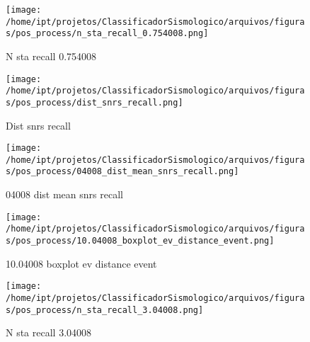                     \begin{figure}[H]
                        \centering
                        \texttt{[image: /home/ipt/projetos/ClassificadorSismologico/arquivos/figuras/pos\_process/n\_sta\_recall\_0.754008.png]}
                        \caption{N sta recall 0.754008}
                        \label{fig:n_sta_recall_0.754008}
                    \end{figure}
                

                    \begin{figure}[H]
                        \centering
                        \texttt{[image: /home/ipt/projetos/ClassificadorSismologico/arquivos/figuras/pos\_process/dist\_snrs\_recall.png]}
                        \caption{Dist snrs recall}
                        \label{fig:dist_snrs_recall}
                    \end{figure}
                

                    \begin{figure}[H]
                        \centering
                        \texttt{[image: /home/ipt/projetos/ClassificadorSismologico/arquivos/figuras/pos\_process/04008\_dist\_mean\_snrs\_recall.png]}
                        \caption{04008 dist mean snrs recall}
                        \label{fig:04008_dist_mean_snrs_recall}
                    \end{figure}
                

                    \begin{figure}[H]
                        \centering
                        \texttt{[image: /home/ipt/projetos/ClassificadorSismologico/arquivos/figuras/pos\_process/10.04008\_boxplot\_ev\_distance\_event.png]}
                        \caption{10.04008 boxplot ev distance event}
                        \label{fig:10.04008_boxplot_ev_distance_event}
                    \end{figure}
                

                    \begin{figure}[H]
                        \centering
                        \texttt{[image: /home/ipt/projetos/ClassificadorSismologico/arquivos/figuras/pos\_process/n\_sta\_recall\_3.04008.png]}
                        \caption{N sta recall 3.04008}
                        \label{fig:n_sta_recall_3.04008}
                    \end{figure}
                

